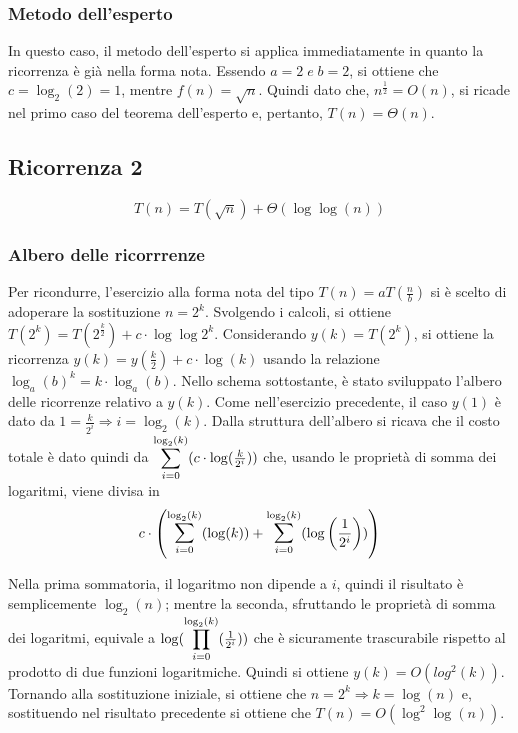\documentclass{article}
\begin{document}
\subsubsection{Metodo dell'esperto}
In questo caso, il metodo dell'esperto si applica immediatamente in quanto la ricorrenza è già nella forma nota. Essendo $a=2\;e\;b=2$, si ottiene che $c=\log_2(2) = 1$, mentre $f(n) = \sqrt{n}$. Quindi dato che, $n^{\frac{1}{2}} = O(n)$, si ricade nel primo caso del teorema dell'esperto e, pertanto, $T(n) = \Theta(n)$.


\subsection{Ricorrenza 2}

\begin{equation*}
   T(n) = T\left(\sqrt{n}\right) + \Theta(\log\log(n))
\end{equation*}

\subsubsection{Albero delle ricorrrenze}
Per ricondurre, l'esercizio alla forma nota del tipo $T(n) = aT\left(\frac{n}{b}\right)$ si è scelto di adoperare la sostituzione  $n = 2^k$. Svolgendo i calcoli, si ottiene $T(2^k) = T\left(2^{\frac{k}{2}}\right) + c\cdot\log\log2^k$. Considerando $y(k) = T(2^k)$, si ottiene la ricorrenza $y(k) = y\left(\frac{k}{2}\right) + c\cdot\log(k)$ usando la relazione $\log_a(b)^k = k \cdot \log_a(b)$. Nello schema sottostante, è stato sviluppato l'albero delle ricorrenze relativo a $y(k)$. Come nell'esercizio precedente, il caso $y(1)$ è dato da $1 = \frac{k}{2^i}\Rightarrow i=\log_2(k)$. Dalla struttura dell'albero si ricava che il costo totale è dato quindi da $\mathlarger{\sum_{i=0}^{\log_2(k)}}(c\cdot\log(\frac{k}{2^i}))$ che, usando le proprietà di somma dei logaritmi, viene divisa in
\begin{equation*}
    c\cdot\left(\mathlarger{\sum}_{i=0}^{\log_2(k)}(\log(k)) +\mathlarger{\sum}_{i=0}^{\log_2(k)}(\log\left(\frac{1}{2^i}\right))\right)
\end{equation*}


Nella prima sommatoria, il logaritmo non dipende a $i$, quindi il risultato è semplicemente $\log_2(n)$; mentre la seconda, sfruttando le proprietà di somma dei logaritmi, equivale a $\log(\mathlarger{\prod}_{i=0}^{\log_2(k)}(\frac{1}{2^i}))$ che è sicuramente trascurabile rispetto al prodotto di due funzioni logaritmiche. Quindi si ottiene $y(k) = O(log^2(k))$. Tornando alla sostituzione iniziale, si ottiene che $n = 2^k \Rightarrow k = \log(n)$ e, sostituendo nel risultato precedente si ottiene che $T(n) = O(\log^2\log(n))$.
\end{document}
